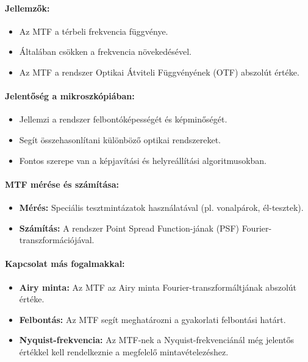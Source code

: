 \documentclass[a4paper,12pt]{article}
\begin{document}
\paragraph{Jellemzők:} 
\begin{itemize}
    \item Az MTF a térbeli frekvencia függvénye.
    \item Általában csökken a frekvencia növekedésével.
    \item Az MTF a rendszer Optikai Átviteli Függvényének (OTF) abszolút értéke.
\end{itemize}

\paragraph{Jelentőség a mikroszkópiában:} 
\begin{itemize}
    \item Jellemzi a rendszer felbontóképességét és képminőségét.
    \item Segít összehasonlítani különböző optikai rendszereket.
    \item Fontos szerepe van a képjavítási és helyreállítási algoritmusokban.
\end{itemize}

\paragraph{MTF mérése és számítása:} 
\begin{itemize}
    \item \textbf{Mérés:} Speciális tesztmintázatok használatával (pl. vonalpárok, él-tesztek).
    \item \textbf{Számítás:} A rendszer Point Spread Function-jának (PSF) Fourier-transzformációjával.
\end{itemize}

\paragraph{Kapcsolat más fogalmakkal:} 
\begin{itemize}
    \item \textbf{Airy minta:} Az MTF az Airy minta Fourier-transzformáltjának abszolút értéke.
    \item \textbf{Felbontás:} Az MTF segít meghatározni a gyakorlati felbontási határt.
    \item \textbf{Nyquist-frekvencia:} Az MTF-nek a Nyquist-frekvenciánál még jelentős értékkel kell rendelkeznie a megfelelő mintavételezéshez.
\end{itemize}
\end{document}
